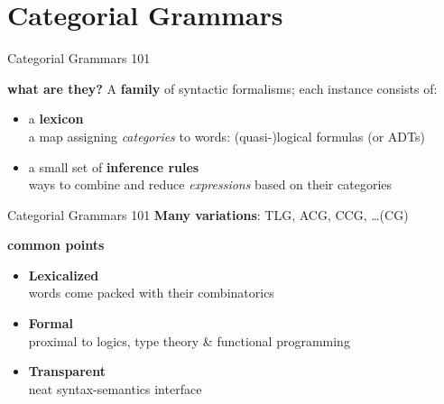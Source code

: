 \documentclass{beamer}
\begin{document}
\section{Categorial Grammars}

\begin{frame}{Categorial Grammars 101}
    \smaller
    \begin{block}{\textbf{\smaller what are they?}}
    A \textbf{family} of syntactic formalisms; each instance consists of:
        \begin{itemize}
            \item a \textbf{lexicon}\\
            a map assigning \textit{categories} to words:
            (quasi-)logical formulas (or ADTs)
            \item a small set of \textbf{inference rules}\\
            ways to combine and reduce \textit{expressions} based on their categories 
        \end{itemize}
    \end{block}
\end{frame}

\begin{frame}{Categorial Grammars 101}
    \smaller
    \textbf{Many variations}: TLG, ACG, CCG, \dots ({\text{*}}CG)\\
    \hfill
    
    {
        \begin{block}{\smaller \textbf{common points}}
            \begin{itemize}
                \item \textbf{Lexicalized}\\
                words come packed with their combinatorics 
                \item \textbf{Formal}\\
                proximal to logics, type theory \& functional programming
                \item \textbf{Transparent}\\
                neat syntax-semantics interface
            \end{itemize}
        \end{block}
    }
\end{frame}
\end{document}
